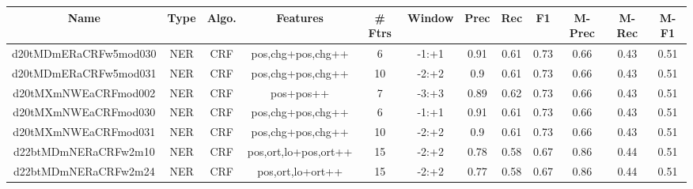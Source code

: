 \documentclass[a4paper]{article}
\begin{document}
\begin{landscape}
\begin{center}
\begin{tabular}{ |c|c|c|c|c|c|c|c|c|c|c|c|}
 \hline
\end{tabular}
\end{center}




\begin{center}
\begin{tabular}{ |c|c|c|c|c|c|c|c|c|c|c|c|} 
 \hline
 	Name & Type & Algo. & Features & \# Ftrs & Window & Prec & Rec & F1 & M-Prec & M-Rec & M-F1\\
 \hline

 	

 
 	
 	\small{ d20tMDmERaCRFw5mod030 } & \small{ NER} & \small{  CRF }  & pos,chg+pos,chg++  &  6 &  \small{  -1:+1 }  &  0.91 & 0.61 & 0.73  &  0.66 & 0.43 & 0.51 \\
 	

 
 	
 	\small{ d20tMDmERaCRFw5mod031 } & \small{ NER} & \small{  CRF }  & pos,chg+pos,chg++  &  10 &  \small{  -2:+2 }  &  0.9 & 0.61 & 0.73  &  0.66 & 0.43 & 0.51 \\
 	

 
 	
 	\small{ d20tMXmNWEaCRFmod002 } & \small{ NER} & \small{  CRF }  & pos+pos++  &  7 &  \small{  -3:+3 }  &  0.89 & 0.62 & 0.73  &  0.66 & 0.43 & 0.51 \\
 	

 
 	
 	\small{ d20tMXmNWEaCRFmod030 } & \small{ NER} & \small{  CRF }  & pos,chg+pos,chg++  &  6 &  \small{  -1:+1 }  &  0.91 & 0.61 & 0.73  &  0.66 & 0.43 & 0.51 \\
 	

 
 	
 	\small{ d20tMXmNWEaCRFmod031 } & \small{ NER} & \small{  CRF }  & pos,chg+pos,chg++  &  10 &  \small{  -2:+2 }  &  0.9 & 0.61 & 0.73  &  0.66 & 0.43 & 0.51 \\
 	

 
 	
 	\small{ d22btMDmNERaCRFw2m10 } & \small{ NER} & \small{  CRF }  & pos,ort,lo+pos,ort++  &  15 &  \small{  -2:+2 }  &  0.78 & 0.58 & 0.67  &  0.86 & 0.44 & 0.51 \\
 	

 
 	
 	\small{ d22btMDmNERaCRFw2m24 } & \small{ NER} & \small{  CRF }  & pos,ort,lo+ort++  &  15 &  \small{  -2:+2 }  &  0.77 & 0.58 & 0.67  &  0.86 & 0.44 & 0.51 \\
 	


\end{tabular}
\end{center}
\end{landscape}
\end{document}
